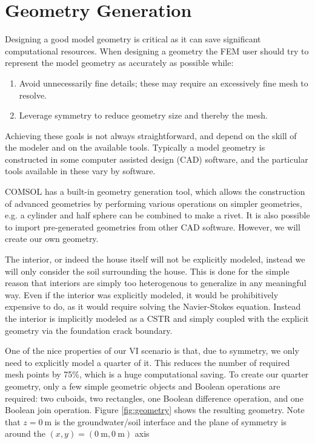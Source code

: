 \section{Geometry Generation}

Designing a good model geometry is critical as it can save significant computational resources.
When designing a geometry the FEM user should try to represent the model geometry as accurately as possible while:
\begin{enumerate}
  \item Avoid unnecessarily fine details; these may require an excessively fine mesh to resolve.
  \item Leverage symmetry to reduce geometry size and thereby the mesh.
\end{enumerate}\par
Achieving these goals is not always straightforward, and depend on the skill of the modeler and on the available tools.
Typically a model geometry is constructed in some computer assisted design (CAD) software, and the particular tools available in these vary by software.\par

COMSOL has a built-in geometry generation tool, which allows the construction of advanced geometries by performing various operations on simpler geometries, e.g. a cylinder and half sphere can be combined to make a rivet.
It is also possible to import pre-generated geometries from other CAD software.
However, we will create our own geometry.\par

The interior, or indeed the house itself will not be explicitly modeled, instead we will only consider the soil surrounding the house.
This is done for the simple reason that interiors are simply too heterogenous to generalize in any meaningful way.
Even if the interior was explicitly modeled, it would be prohibitively expensive to do, as it would require solving the Navier-Stokes equation.
Instead the interior is implicitly modeled as a CSTR and simply coupled with the explicit geometry via the foundation crack boundary.\par

One of the nice properties of our VI scenario is that, due to symmetry, we only need to explicitly model a quarter of it.
This reduces the number of required mesh points by 75\%, which is a huge computational saving.
To create our quarter geometry, only a few simple geometric objects and Boolean operations are required: two cuboids, two rectangles, one Boolean difference operation, and one Boolean join operation.
Figure \ref{fig:geometry} shows the resulting geometry.
Note that $z = \SI{0}{\metre}$ is the groundwater/soil interface and the plane of symmetry is around the $(x, y) = (\SI{0}{\metre},\SI{0}{\metre})$ axis\par

